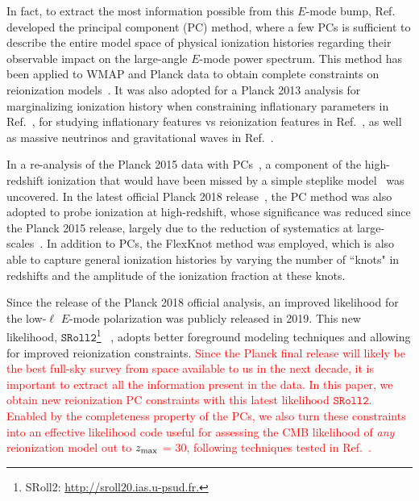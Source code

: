 \documentclass[prd,twocolumn,amsmath,amssymb,floatfix,superscriptaddress,nofootinbib]{revtex4-1}
\newcommand{\zmax}{z_{\rm max}}
\newcommand{\ch}[1]{\textcolor{red}{#1}}
\begin{document}
In fact, to extract the most information possible from this $E$-mode bump, Ref.~\cite{Hu:2003gh, Mortonson:2007hq} developed the principal component (PC) method, where a few PCs is sufficient to describe the entire model space of physical ionization histories regarding their observable impact on the large-angle $E$-mode power spectrum. This method has been applied to WMAP and Planck data to obtain complete constraints on reionization models~\cite{Mortonson:2008rx, Mortonson:2007hq, Heinrich:2016ojb, Aghanim:2018eyx}. It was also adopted for a Planck 2013 analysis for marginalizing ionization history when constraining inflationary parameters in Ref.~\cite{Planck:2013jfk}, for studying inflationary features vs reionization features in Ref.~\cite{Obied:2018qdr}, as well as massive neutrinos and gravitational waves in Ref.~\cite{Dai:2015dwa}. %

In a re-analysis of the Planck 2015 data with PCs~\cite{Heinrich:2016ojb}, a component of the high-redshift ionization that would have been missed by a simple steplike model~\cite{Heinrich:2016ojb} was uncovered. In the latest official Planck 2018 release~\cite{Aghanim:2018eyx}, the PC method was also adopted to probe ionization at high-redshift, whose significance was reduced since the Planck 2015 release, largely due to the reduction of systematics at large-scales~\cite{Aghanim:2018eyx, Heinrich:2018btc}. In addition to PCs, the FlexKnot method was employed, which is also able to capture general ionization histories by varying the number of ``knots" in redshifts and the amplitude of the ionization fraction at these knots. 

Since the release of the Planck 2018 official analysis, an improved likelihood for the low-$\ell$ $E$-mode polarization was publicly released in 2019. This new likelihood,
$\texttt{SRoll2}$\footnote{SRoll2: \url{http://sroll20.ias.u-psud.fr.}}
~\cite{Delouis:2019bub}, adopts better foreground modeling techniques and allowing for improved reionization constraints.
%
%
\ch{Since the Planck final release will likely be the best full-sky survey from space available to us in the next decade, it is important to extract all the information present in the data. In this paper, we obtain new reionization PC constraints with this latest likelihood $\texttt{SRoll2}$. Enabled by the completeness property of the PCs, we also turn these constraints into an effective likelihood code useful for assessing the CMB likelihood of \textit{any} reionization model out to $\zmax$ = 30, following techniques tested in Ref.~\cite{Heinrich:2016ojb}. 
}
\end{document}
